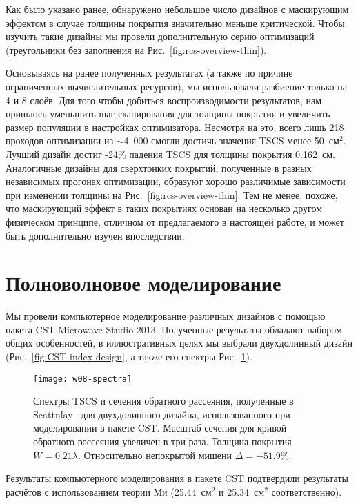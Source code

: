 Как было указано ранее, обнаружено небольшое число дизайнов с
маскирующим эффектом в случае толщины покрытия значительно меньше
критической.  Чтобы изучить такие дизайны мы провели дополнительную серию
оптимизаций (треугольники без заполнения на Рис.~\ref{fig:rcs-overview-thin}).
\begin{figure}
\end{figure}
Основываясь на ранее полученных результатах (а также по причине
ограниченных вычислительных ресурсов), мы использовали разбиение
только на 4 и 8 слоёв.  Для того чтобы добиться воспроизводимости
результатов, нам пришлось уменьшить шаг сканирования для толщины
покрытия и увеличить размер популяции в настройках оптимизатора.
Несмотря на это, всего лишь 218 проходов оптимизации из $\sim$4~000
смогли достичь значения TSCS менее 50~см$^2$.  Лучший дизайн достиг
-24\% падения TSCS для толщины покрытия 0.162~см.  Аналогичные дизайны
для сверхтонких покрытий, полученные в разных независимых прогонах
оптимизации, образуют хорошо различимые зависимости при изменении
толщины на Рис.~\ref{fig:rcs-overview-thin}.  Тем не менее, похоже, что
маскирующий эффект в таких покрытиях основан на несколько другом
физическом принципе, отличном от предлагаемого в настоящей работе, и
может быть дополнительно изучен впоследствии.

\section{Полноволновое моделирование}

Мы провели компьютерное моделирование различных дизайнов с помощью
пакета CST Microwave Studio 2013.  Полученные результаты обладают
набором общих особенностей, в иллюстративных целях мы выбрали
двухдолинный дизайн (Рис.~\ref{fig:CST-index-design}, а также его спектры Рис.~\ref{fig:CST-design-spectra}).
\begin{figure}
  \texttt{[image: w08-spectra]}%
  \caption{Спектры TSCS и сечения обратного рассеяния, полученные в
    Scattnlay~\cite{Pena-scattnlay-2009} для двухдолинного дизайна,
    использованного при моделировании в пакете CST. Масштаб сечения
    для кривой обратного рассеяния увеличен в три раза.  Толщина
    покрытия $W=0.21\lambda$. Относительно непокрытой мишени $\Delta =-51.9$\%.     %
    \label{fig:CST-design-spectra}}%
\end{figure}
Результаты компьютерного моделирования в пакете CST подтвердили
результаты расчётов с использованием теории Ми (25.44~см$^2$ и
25.34~см$^2$ соответственно).

